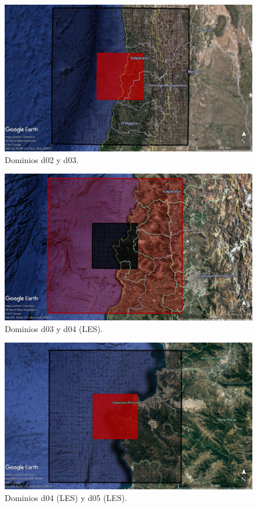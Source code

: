 \begin{figure}[H]
	\centering
	\includegraphics[width=0.95\linewidth]{Imagenes/d05d04}
	\caption{Dominios d02 y d03.}
	\label{fig:0203}
\end{figure}

\begin{figure}[H]
	\centering
	\includegraphics[width=0.95\linewidth]{Imagenes/d04d03}
	\caption{Dominios d03 y d04 (LES).}
	\label{fig:0304}
\end{figure}

\begin{figure}[H]
	\centering
	\includegraphics[width=0.95\linewidth]{Imagenes/d03d02}
	\caption{Dominios d04 (LES) y d05 (LES).}
	\label{fig:0405}
\end{figure}

